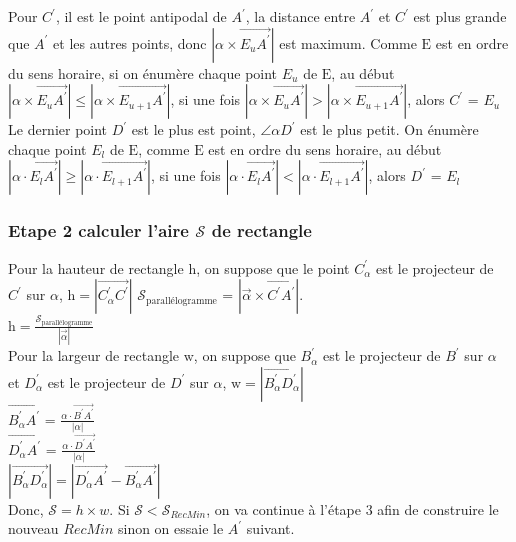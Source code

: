 \documentclass[14px]{article}
\begin{document}
Pour $C^{\prime}$, il est le point antipodal de $A^{\prime}$, la distance entre $A^{\prime}$ et $C^{\prime}$ est plus grande que $A^{\prime}$ et les autres points, donc $|\alpha\times\overrightarrow{E_{u}A^{\prime}}|$ est maximum. Comme $\mathrm{E}$ est en ordre du sens horaire, si on énumère chaque point $E_{u}$ de $\mathrm{E}$, au début $|\alpha\times\overrightarrow{E_{u}A^{\prime}}| \leqslant |\alpha\times\overrightarrow{E_{u+1}A^{\prime}}|$, si une fois $|\alpha\times\overrightarrow{E_{u}A^{\prime}}| > |\alpha\times\overrightarrow{E_{u+1}A^{\prime}}|$, alors $C^{\prime}$ = $E_{u}$\\

Le dernier point $D^{\prime}$ est le plus est point, $\angle \alpha D^{\prime}$ est le plus petit. On énumère chaque point $E_{l}$ de $\mathrm{E}$, comme $\mathrm{E}$ est en ordre du sens horaire, au début $|\alpha\cdot\overrightarrow{E_{l}A^{\prime}}| \geq|\alpha\cdot\overrightarrow{E_{l+1}A^{\prime}}|$, si une fois $|\alpha\cdot\overrightarrow{E_{l}A^{\prime}}| < |\alpha\cdot\overrightarrow{E_{l+1}A^{\prime}}|$, alors $D^{\prime}$ = $E_{l}$\\

\subsubsection{Etape 2 calculer l'aire $\mathcal{S}$ de rectangle}
Pour la hauteur de rectangle $\mathrm{h}$, on suppose que le point $C^{\prime}_{\alpha}$ est le projecteur de $C^{\prime}$ sur $\alpha$, $\mathrm{h}= |\overrightarrow{C^{\prime}_{\alpha}C^{\prime}}|$  
$\mathcal{S}_{\text{parallélogramme}}$ = $|\vec{\alpha}\times\overrightarrow{C^{\prime}A^{\prime}}|$. \\
$\mathrm{h} =  \frac{\mathcal{S}_{\text{parallélogramme}}}{|\vec{\alpha}|}$\\

Pour la largeur de rectangle $\mathrm{w}$, on suppose que $B^{\prime}_{\alpha}$ est le projecteur de $B^{\prime}$ sur $\alpha$ et $D^{\prime}_{\alpha}$ est le projecteur de $D^{\prime}$ sur $\alpha$, $\mathrm{w} = |\overrightarrow{B^{\prime}_{\alpha}D^{\prime}_{\alpha}}|$\\
$\overrightarrow{B^{\prime}_{\alpha}A^{\prime}}$ = $\frac{\alpha\cdot\overrightarrow{B^{\prime}A^{\prime}}}{|\alpha|}$\\
$\overrightarrow{D^{\prime}_{\alpha}A^{\prime}}$ = $\frac{\alpha\cdot\overrightarrow{D^{\prime}A^{\prime}}}{|\alpha|}$\\
$|\overrightarrow{B^{\prime}_{\alpha}D^{\prime}_{\alpha}}| = |\overrightarrow{D^{\prime}_{\alpha}A^{\prime}} - \overrightarrow{B^{\prime}_{\alpha}A^{\prime}}|$\\
Donc, $\mathcal{S} = h \times w$. Si $\mathcal{S} < \mathcal{S}_{RecMin}$, on va continue à l'étape 3 afin de construire le nouveau $RecMin$ sinon on essaie le $A^{\prime}$ suivant.\\ 
\end{document}
